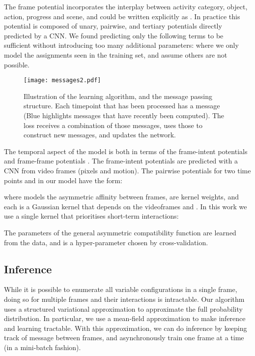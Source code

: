 \documentclass[10pt,twocolumn,letterpaper]{article}
\newcommand{\myparagraph}[1]{\vspace{.3em}\noindent{\bf #1}}
\begin{document}
\myparagraph{Semantic aspect}
The frame potential  incorporates the interplay between activity category, object, action, progress and scene, and could be written explicitly as . In practice this potential is composed of unary, pairwise, and tertiary potentials directly predicted by a CNN. We found predicting only the following terms to be sufficient without introducing too many additional parameters:
 where we only model the assignments seen in the training set, and assume others are not possible.

\begin{figure}
\centering
\texttt{[image: messages2.pdf]}
\caption{Illustration of the learning algorithm, and the message passing structure. Each timepoint that has been processed has a message (Blue highlights messages that have recently been computed). The loss receives a combination of those messages, uses those to construct new messages, and updates the network. }
\label{fig:learning}
\end{figure}

\myparagraph{Temporal aspect}
The temporal aspect of the model is both in terms of the frame-intent potentials  and frame-frame potentials . The frame-intent potentials are predicted with a CNN from video frames (pixels and motion). The pairwise potentials  for two time points  and  in our model have the form:

where  models the asymmetric affinity between frames,  are kernel weights, and each  is a Gaussian kernel that depends on the videoframes  and . In this work we use a single kernel that prioritises short-term interactions:

The parameters of the general asymmetric compatibility function  are learned from the data, and  is a hyper-parameter chosen by cross-validation.

\subsection{Inference}

While it is possible to enumerate all variable configurations in a single frame, doing so for multiple frames and their interactions is intractable. Our algorithm uses a structured variational approximation to approximate the full probability distribution. In particular, we use a mean-field approximation to make inference and learning tractable. With this approximation, we can do inference by keeping track of message between frames, and asynchronously train one frame at a time (in a mini-batch fashion). 
\end{document}
